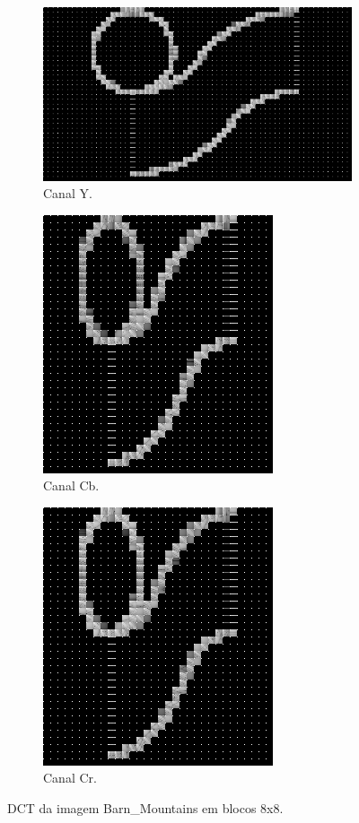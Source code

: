 \documentclass[a4paper, 12pt]{article}
\begin{document}
        \begin{figure}[H]
            \begin{subfigure}{0.3\textwidth}
                \centering
                \includegraphics[width=\textwidth]{resources/DCT/Ydct8_logo.png}
                \caption{ Canal Y.}
            \end{subfigure}
            \hfill
            \begin{subfigure}{0.3\textwidth}
                \centering 
                \includegraphics[scale=0.5]{resources/DCT/CBdct8_logo.png}
                \caption{ Canal Cb.}
            \end{subfigure}
            \hfill
            \begin{subfigure}{0.3\textwidth}
                \centering
                \includegraphics[scale=0.5]{resources/DCT/CRdct8_logo.png}
                \caption{ Canal Cr.}
            \end{subfigure}
            \caption{\label{fig:my_label} DCT da imagem Barn\_Mountains em blocos 8x8.}
        \end{figure}
\end{document}
